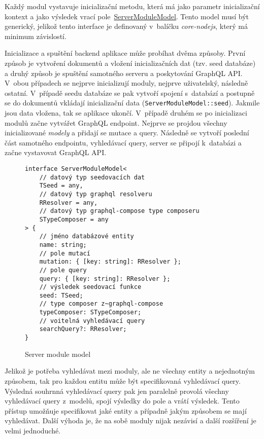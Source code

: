 Každý modul vystavuje inicializační metodu, která má jako parametr inicializační kontext a jako výsledek vrací pole~\hyperref[code:server_module_model]{ServerModuleModel}. Tento model musí být generický, jelikož tento interface je definovaný v~balíčku \emph{core-nodejs}, který má minimum závislostí.

Inicializace a spuštění backend aplikace může probíhat dvěma způsoby. První způsob je vytvoření dokumentů a vložení inicializačních dat (tzv. seed databáze) a druhý způsob je spuštění samotného serveru a poskytování GraphQL API. V~obou případech se nejprve inicializují moduly, nejprve uživatelský, následně ostatní. V~případě seedu databáze se pak vytvoří spojení s~databází a postupně se do dokumentů vkládají inicializační data (\texttt{ServerModuleModel::seed}). Jakmile jsou data vložena, tak se aplikace ukončí. V~případě druhém se po inicializaci modulů začne vytvářet GraphQL endpoint. Nejprve se projdou všechny inicializované \emph{modely} a přidají se mutace a query. Následně se vytvoří poslední část samotného endpointu, vyhledávací query, server se připojí k~databázi a začne vystavovat GraphQL API.

\begin{figure}
    \centering
    \begin{verbatim}
interface ServerModuleModel<
    // datový typ seedovacích dat    
    TSeed = any,
    // datový typ graphql resolveru
    RResolver = any,
    // datový typ graphql-compose type composeru
    STypeComposer = any
> {
    // jméno databázové entity    
    name: string;
    // pole mutací
    mutation: { [key: string]: RResolver };
    // pole query
    query: { [key: string]: RResolver };
    // výsledek seedovací funkce
    seed: TSeed;
    // type composer z~graphql-compose 
    typeComposer: STypeComposer;
    // voitelná vyhledávací query
    searchQuery?: RResolver;
}
    \end{verbatim}
    \caption{Server module model}
    \label{code:server_module_model}
\end{figure}

Jelikož je potřeba vyhledávat mezi moduly, ale ne všechny entity a nejednotným způsobem, tak pro každou entitu může být specifikovaná vyhledávací query. Výsledná souhrnná vyhledávací query pak jen paralelně provolá všechny vyhledávací query z~modelů, spojí výsledky do pole a vrátí výsledek. Tento přístup umožňuje specifikovat jaké entity a případně jakým způsobem se mají vyhledávat. Další výhoda je, že na sobě moduly nijak nezávisí a další rozšíření je velmi jednoduché.
